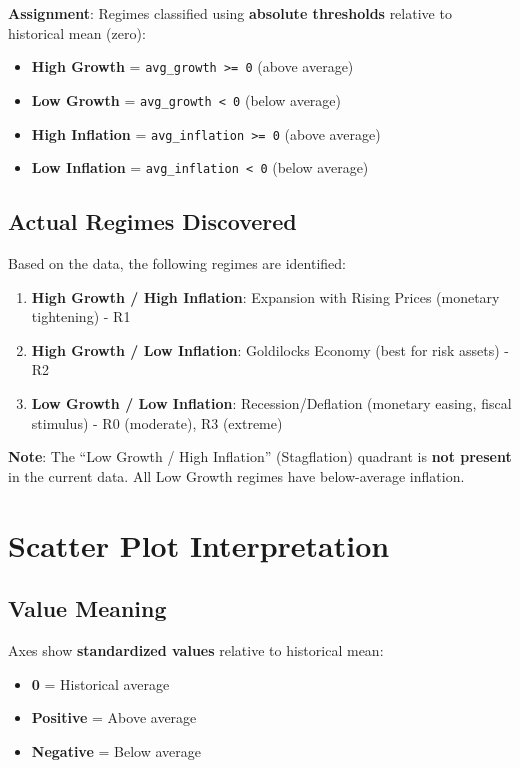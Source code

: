 \documentclass[11pt,a4paper]{article}
\begin{document}
\textbf{Assignment}: Regimes classified using \textbf{absolute thresholds} relative to historical mean (zero):
\begin{itemize}[leftmargin=*]
    \item \textbf{High Growth} = \texttt{avg\_growth >= 0} (above average)
    \item \textbf{Low Growth} = \texttt{avg\_growth < 0} (below average)
    \item \textbf{High Inflation} = \texttt{avg\_inflation >= 0} (above average)
    \item \textbf{Low Inflation} = \texttt{avg\_inflation < 0} (below average)
\end{itemize}

\subsection{Actual Regimes Discovered}

Based on the data, the following regimes are identified:

\begin{enumerate}[leftmargin=*]
    \item \textbf{High Growth / High Inflation}: Expansion with Rising Prices (monetary tightening) - R1
    \item \textbf{High Growth / Low Inflation}: Goldilocks Economy (best for risk assets) - R2
    \item \textbf{Low Growth / Low Inflation}: Recession/Deflation (monetary easing, fiscal stimulus) - R0 (moderate), R3 (extreme)
\end{enumerate}

\textbf{Note}: The ``Low Growth / High Inflation'' (Stagflation) quadrant is \textbf{not present} in the current data. All Low Growth regimes have below-average inflation.

\section{Scatter Plot Interpretation}

\subsection{Value Meaning}

Axes show \textbf{standardized values} relative to historical mean:
\begin{itemize}[leftmargin=*]
    \item \textbf{0} = Historical average
    \item \textbf{Positive} = Above average
    \item \textbf{Negative} = Below average
\end{itemize}
\end{document}

